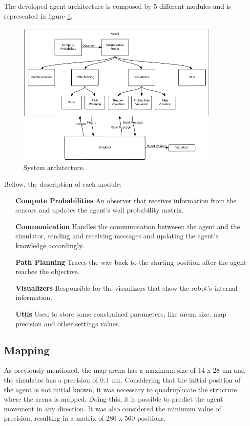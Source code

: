 \documentclass[oribibl]{llncs}
\begin{document}
The developed agent architecture is composed by 5 different modules and is represented in figure \ref{fig:robot-arch}.

\begin{figure}
  \centering
  \includegraphics[width=0.9\textwidth]{robot-architecture.png}
  \caption{System architecture.}
  \label{fig:robot-arch}
\end{figure}

Bellow, the description of each module:

\begin{itemize}
  \item[\textbf{Compute Probabilities}]
  An observer that receives information from the sensors and updates the agent’s wall probability matrix.
  \item[\textbf{Communication}]
  Handles the communication betweeen the agent and the simulator, sending and receiving messages and updating the agent's knowledge accordingly. 
  \item[\textbf{Path Planning}]
  Traces the way back to the starting position after the agent reaches the objective.
  \item[\textbf{Visualizers}]
  Responsible for the visualizers that show the robot's internal information.
  \item[\textbf{Utils}]
  Used to store some constrained parameters, like arena size, map precision and other settings values.
\end{itemize}

\subsection{Mapping}

As previously mentioned, the map arena has a maximum size of 14 x 28 um and the simulator has a precision of 0.1 um. Considering that the initial position of the agent is not initial known, it was necessary to quadruplicate the structure where the arena is mapped. Doing this, it is possible to predict the agent movement in any direction. It was also considered the minimum value of precision, resulting in a matrix of 280 x 560 positions. 
\end{document}
